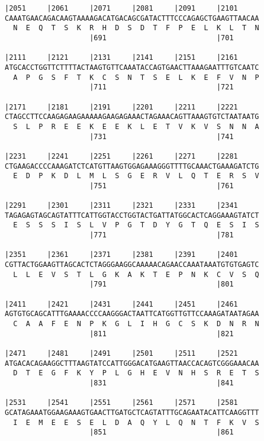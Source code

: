 \documentclass{article}
\begin{document}
\newpage
\begin{Verbatim}[fontfamily=courier]
|2051     |2061     |2071     |2081     |2091     |2101     
CAAATGAACAGACAAGTAAAAGACATGACAGCGATACTTTCCCAGAGCTGAAGTTAACAA
  N  E  Q  T  S  K  R  H  D  S  D  T  F  P  E  L  K  L  T  N
                    |691                          |701      

|2111     |2121     |2131     |2141     |2151     |2161     
ATGCACCTGGTTCTTTTACTAAGTGTTCAAATACCAGTGAACTTAAAGAATTTGTCAATC
  A  P  G  S  F  T  K  C  S  N  T  S  E  L  K  E  F  V  N  P
                    |711                          |721      

|2171     |2181     |2191     |2201     |2211     |2221     
CTAGCCTTCCAAGAGAAGAAAAAGAAGAGAAACTAGAAACAGTTAAAGTGTCTAATAATG
  S  L  P  R  E  E  K  E  E  K  L  E  T  V  K  V  S  N  N  A
                    |731                          |741      

|2231     |2241     |2251     |2261     |2271     |2281     
CTGAAGACCCCAAAGATCTCATGTTAAGTGGAGAAAGGGTTTTGCAAACTGAAAGATCTG
  E  D  P  K  D  L  M  L  S  G  E  R  V  L  Q  T  E  R  S  V
                    |751                          |761      

|2291     |2301     |2311     |2321     |2331     |2341     
TAGAGAGTAGCAGTATTTCATTGGTACCTGGTACTGATTATGGCACTCAGGAAAGTATCT
  E  S  S  S  I  S  L  V  P  G  T  D  Y  G  T  Q  E  S  I  S
                    |771                          |781      

|2351     |2361     |2371     |2381     |2391     |2401     
CGTTACTGGAAGTTAGCACTCTAGGGAAGGCAAAAACAGAACCAAATAAATGTGTGAGTC
  L  L  E  V  S  T  L  G  K  A  K  T  E  P  N  K  C  V  S  Q
                    |791                          |801      

|2411     |2421     |2431     |2441     |2451     |2461     
AGTGTGCAGCATTTGAAAACCCCAAGGGACTAATTCATGGTTGTTCCAAAGATAATAGAA
  C  A  A  F  E  N  P  K  G  L  I  H  G  C  S  K  D  N  R  N
                    |811                          |821      

|2471     |2481     |2491     |2501     |2511     |2521     
ATGACACAGAAGGCTTTAAGTATCCATTGGGACATGAAGTTAACCACAGTCGGGAAACAA
  D  T  E  G  F  K  Y  P  L  G  H  E  V  N  H  S  R  E  T  S
                    |831                          |841      

|2531     |2541     |2551     |2561     |2571     |2581     
GCATAGAAATGGAAGAAAGTGAACTTGATGCTCAGTATTTGCAGAATACATTCAAGGTTT
  I  E  M  E  E  S  E  L  D  A  Q  Y  L  Q  N  T  F  K  V  S
                    |851                          |861      

\end{Verbatim}
\end{document}
